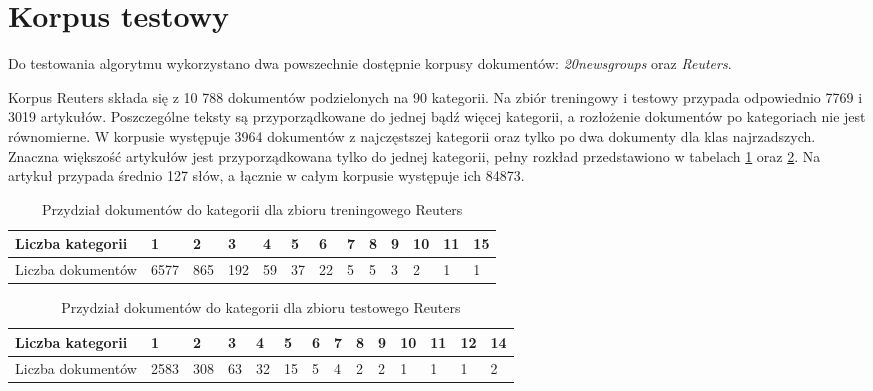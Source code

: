 \documentclass{pracamgr}
\begin{document}
\section{Korpus testowy}
Do testowania algorytmu wykorzystano dwa powszechnie dostępnie korpusy dokumentów: \textit{20newsgroups} oraz \textit{Reuters}.

Korpus Reuters składa się z 10 788 dokumentów podzielonych na 90 kategorii. Na zbiór treningowy i testowy przypada odpowiednio 7769 i 3019 artykułów. Poszczególne teksty są przyporządkowane do jednej bądź więcej kategorii, a rozłożenie dokumentów po kategoriach nie jest równomierne. W korpusie występuje 3964 dokumentów z najczęstszej kategorii oraz tylko po dwa dokumenty dla klas najrzadszych. Znaczna większość artykułów jest przyporządkowana tylko do jednej kategorii, pełny rozkład przedstawiono w tabelach \ref{reuters-train} oraz \ref{reuters-test}. Na artykuł przypada średnio 127 słów, a łącznie w całym korpusie występuje ich 84873.

\begin{table}[H]
\centering
\begin{tabular}{|l|l|l|l|l|l|l|l|l|l|l|l|l|}
\hline
Liczba kategorii & 1 & 2 & 3 & 4 & 5 & 6 & 7 & 8 & 9 & 10 & 11 & 15 \\ \hline
Liczba dokumentów & 6577 & 865 & 192 & 59 & 37 & 22 & 5 & 5 & 3 & 2 & 1 & 1 \\ \hline
\end{tabular}
\caption{Przydział dokumentów do kategorii dla zbioru treningowego Reuters}
\label{reuters-train}
\end{table}

\begin{table}[H]
\centering
\begin{tabular}{|l|l|l|l|l|l|l|l|l|l|l|l|l|l|}
\hline
Liczba kategorii & 1 & 2 & 3 & 4 & 5 & 6 & 7 & 8 & 9 & 10 & 11 & 12 & 14 \\ \hline
Liczba dokumentów & 2583 & 308 & 63 & 32 & 15 & 5 & 4 & 2 & 2 & 1 & 1 & 1 & 2 \\ \hline
\end{tabular}
\caption{Przydział dokumentów do kategorii dla zbioru testowego Reuters}
\label{reuters-test}
\end{table}
\end{document}
